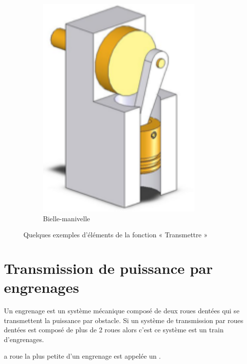 \documentclass[10pt,fleqn]{article} %
\begin{document}
\begin{figure}[h]
\begin{subfigure}{0.25\textwidth}
    \includegraphics[width=0.9\textwidth,height=.1\textheight,keepaspectratio]{images/bielle_manivelle}
    \caption{Bielle-manivelle}
  \end{subfigure}
  \caption{Quelques exemples d'éléments de la fonction « Transmettre »}
  \label{fig:exemples}
\end{figure}

\section{Transmission de puissance par engrenages}
\begin{definition}
  Un engrenage est un système mécanique composé de deux roues dentées qui se transmettent la puissance par obstacle.
  Si un système de transmission par roues dentées est composé de plus de 2 roues alors c’est ce système est un train d’engrenages.
\end{definition}

\begin{remark}
  a roue la plus petite d’un engrenage est appelée un .
\end{remark}
\end{document}
